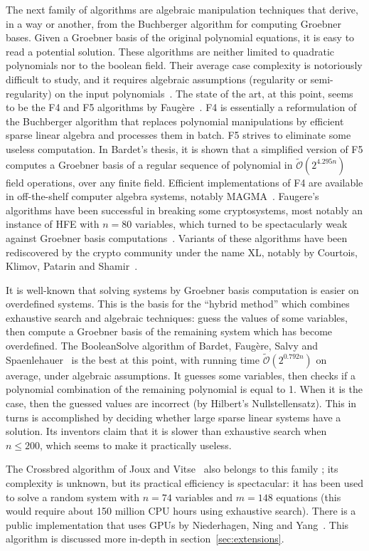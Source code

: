 \documentclass[a4paper,UKenglish,cleveref, autoref]{lipics-v2019}
\newcommand{\bigOsoft}[1]{\ensuremath{\mathcal{\tilde O}\left( #1 \right)} }
\begin{document}
The next family of algorithms are algebraic manipulation techniques that derive,
in a way or another, from the Buchberger algorithm for computing Groebner
bases. Given a Groebner basis of the original polynomial equations, it is easy
to read a potential solution. These algorithms are neither limited to quadratic
polynomials nor to the boolean field. Their average case complexity is
notoriously difficult to study, and it requires algebraic assumptions
(regularity or semi-regularity) on the input polynomials~\cite{BardetFS15}.  The
state of the art, at this point, seems to be the F4 and F5 algorithms by
Faugère~\cite{F4,F5}. F4 is essentially a reformulation of the Buchberger
algorithm that replaces polynomial manipulations by efficient sparse linear
algebra and processes them in batch. F5 strives to eliminate some useless
computation. In Bardet's thesis, it is shown that a simplified version of F5
computes a Groebner basis of a regular sequence of polynomial in
$\bigOsoft{2^{4.295n}}$ field operations, over any finite field. Efficient
implementations of F4 are available in off-the-shelf computer algebra systems,
notably \textsf{MAGMA}~\cite{MAGMA}. Faugere's algorithms have been successful
in breaking some cryptosystems, most notably an instance of HFE with $n=80$
variables, which turned to be spectacularly weak against Groebner basis
computations~\cite{FaugereJ03}. Variants of these algorithms have been
rediscovered by the crypto community under the name XL, notably by Courtois,
Klimov, Patarin and Shamir~\cite{CourtoisKPS00}.

It is well-known that solving systems by Groebner basis computation is easier on
overdefined systems. This is the basis for the ``hybrid method'' which combines
exhaustive search and algebraic techniques: guess the values of some variables,
then compute a Groebner basis of the remaining system which has become
overdefined. The \textsf{BooleanSolve} algorithm of Bardet, Faugère, Salvy and
Spaenlehauer~\cite{BardetFSS13} is the best at this point, with running time
$\bigOsoft{2^{0.792n}}$ on average, under algebraic assumptions. It guesses some
variables, then checks if a polynomial combination of the remaining polynomial
is equal to 1. When it is the case, then the guessed values are incorrect (by
Hilbert's Nullstellensatz). This in turns is accomplished by deciding whether
large sparse linear systems have a solution. Its inventors claim that it is
slower than exhaustive search when $n \leq 200$, which seems to make it
practically useless.

The \textsf{Crossbred} algorithm of Joux and Vitse~\cite{JouxV17} also belongs
to this family ; its complexity is unknown, but its practical efficiency is
spectacular: it has been used to solve a random system with $n = 74$ variables
and $m=148$ equations (this would require about 150 million CPU hours using
exhaustive search). There is a public implementation that uses GPUs by
Niederhagen, Ning and Yang~\cite{NiederhagenNY18}. This algorithm is discussed
more in-depth in section~\ref{sec:extensions}.
\end{document}
